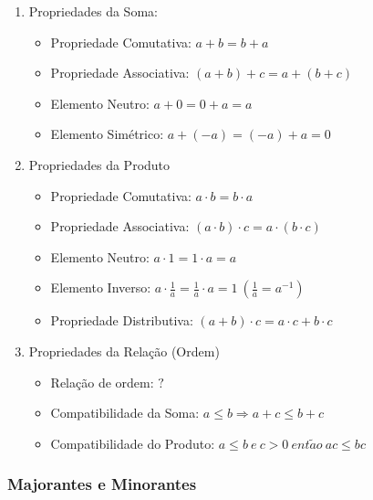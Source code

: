 \documentclass[11pt]{article}
\begin{document}
\begin{enumerate}
    \item Propriedades da Soma:
    \begin{itemize}[topsep=0pt]
        \item Propriedade Comutativa: $a + b = b + a$
        \item Propriedade Associativa: $\left(a + b\right) + c = a + \left(b + c\right)$
        \item Elemento Neutro: $a + 0 = 0 + a = a$
        \item Elemento Simétrico: $a + \left(-a\right) = \left(-a\right) + a = 0$
    \end{itemize}
    \item Propriedades da Produto
    \begin{itemize}[topsep=0pt]
        \item Propriedade Comutativa: $a \cdot b = b \cdot a$
        \item Propriedade Associativa: 
            $\left(a \cdot b\right) \cdot c = a \cdot \left(b \cdot c\right)$
        \item Elemento Neutro: $a \cdot 1 = 1 \cdot a = a$
        \item Elemento Inverso: 
            $\displaystyle a \cdot \frac{1}{a} = \frac{1}{a} \cdot a = 1 \ 
            \left(\frac{1}{a} = a^{-1}\right)$
        \item Propriedade Distributiva: $(a + b) \cdot c = a \cdot c + b \cdot c$
    \end{itemize}
    \item Propriedades da Relação (Ordem)
    \begin{itemize}[topsep=0pt]
        \item Relação de ordem: $?$
        \item Compatibilidade da Soma: $a \leq b \Rightarrow a + c \leq b + c$
        \item Compatibilidade do Produto: 
            $a \leq b \ e \ c > 0 \ ent\tilde{a}o \ ac \leq bc$
    \end{itemize}
\end{enumerate}

\subsubsection{Majorantes e Minorantes}
\end{document}
